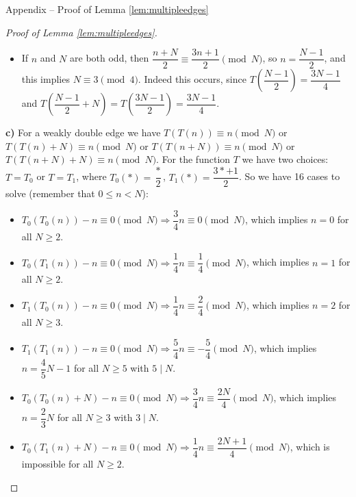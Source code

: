 \documentclass[10pt]{article}
\theoremstyle{definition}
\begin{document}
\begin{section}{Appendix -- Proof of Lemma \ref{lem:multipleedges}}
{\begin{proof}[Proof of Lemma \ref{lem:multipleedges}]
\begin{itemize}
            $ n = \dfrac{N-1}{2} $, and this implies $ N \equiv 1 \pmod{4} $. Indeed this occurs, since
            $ T\left(\dfrac{N-1}{2}\right) = \dfrac{N-1}{4} $ and $ T\left(\dfrac{N-1}{2}+N\right) =
            T\left(\dfrac{3N-1}{2}\right) = \dfrac{9N-1}{4} \equiv \dfrac{N-1}{4} \pmod{N} $.
            \item If $ n $ and $ N $ are both odd, then $ \dfrac{n+N}{2} \equiv \dfrac{3n+1}{2} \pmod{N} $, so
            $ n = \dfrac{N-1}{2} $, and this implies $ N \equiv 3 \pmod{4} $. Indeed this occurs, since
            $ T\left(\dfrac{N-1}{2}\right) = \dfrac{3N-1}{4} $ and $ T\left(\dfrac{N-1}{2}+N\right) =
            T\left(\dfrac{3N-1}{2}\right) = \dfrac{3N-1}{4} $.
        \end{itemize}
        \textbf{c)} For a weakly double edge we have $ T(T(n)) \equiv n \pmod{N} $ or
        $ T(T(n)+N) \equiv n \pmod{N} $ or $ T(T(n+N)) \equiv n \pmod{N} $ or $ T(T(n+N)+N) \equiv n \pmod{N} $.
        For the function $ T $ we have two choices: $ T = T_0 $ or $ T = T_1 $, where
        $ T_0(\ast) = \dfrac{\ast}{2} $, $ T_1(\ast) = \dfrac{3\ast+1}{2} $. So we have 16 cases to solve
        (remember that $ 0 \leq n < N $):
        \begin{itemize} \setlength{\itemsep}{0pt}
            \item $ T_0(T_0(n))     - n \equiv 0 \pmod{N} \Rightarrow
            \dfrac{3}{4} n \equiv 0 \pmod{N} $, which implies $ n = 0 $ for all $ N \geq 2 $.
            \item $ T_0(T_1(n))     - n \equiv 0 \pmod{N} \Rightarrow
            \dfrac{1}{4} n \equiv \dfrac{1}{4} \pmod{N} $, which implies $ n = 1 $ for all $ N \geq 2 $.
            \item $ T_1(T_0(n))     - n \equiv 0 \pmod{N} \Rightarrow
            \dfrac{1}{4} n \equiv \dfrac{2}{4} \pmod{N} $, which implies $ n = 2 $ for all $ N \geq 3 $.
            \item $ T_1(T_1(n))     - n \equiv 0 \pmod{N} \Rightarrow
            \dfrac{5}{4} n \equiv - \dfrac{5}{4} \pmod{N} $, which implies $ n = \dfrac{4}{5} N - 1 $
            for all $ N \geq 5 $ with $ 5 \mid N $.
            \item $ T_0(T_0(n)+N)   - n \equiv 0 \pmod{N} \Rightarrow
            \dfrac{3}{4} n \equiv \dfrac{2N}{4} \pmod{N} $, which implies $ n = \dfrac{2}{3} N $
            for all $ N \geq 3 $ with $ 3 \mid N $.
            \item $ T_0(T_1(n)+N)   - n \equiv 0 \pmod{N} \Rightarrow
            \dfrac{1}{4} n \equiv \dfrac{2N+1}{4} \pmod{N} $, which is impossible for all $ N \geq 2 $.

\end{itemize}
\end{proof}}
\end{section}
\end{document}
